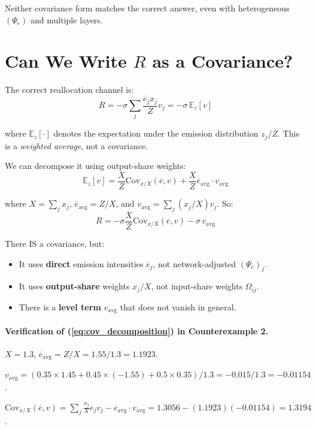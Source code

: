 \documentclass[11pt]{article}
\begin{document}
Neither covariance form matches the correct answer, even with heterogeneous $(\Psi_e)$ and multiple layers.

\section{Can We Write $R$ as a Covariance?}

The correct reallocation channel is:
$$R = -\sigma \sum_j \frac{\overline{e}_j x_j}{Z}v_j = -\sigma\, \mathbb{E}_{z}[v]$$

where $\mathbb{E}_z[\cdot]$ denotes the expectation under the emission distribution $z_j/Z$. This is a \textit{weighted average}, not a covariance.

We can decompose it using output-share weights:
$$\mathbb{E}_z[v] = \frac{X}{Z}\text{Cov}_{x/X}(\overline{e}, v) + \frac{X}{Z}\overline{e}_{\text{avg}} \cdot v_{\text{avg}}$$

where $X = \sum_j x_j$, $\overline{e}_{\text{avg}} = Z/X$, and $v_{\text{avg}} = \sum_j (x_j/X)v_j$. So:
\begin{equation}
    \label{eq:cov_decomposition}
    R = -\sigma\frac{X}{Z}\text{Cov}_{x/X}(\overline{e}, v) - \sigma\, v_{\text{avg}}
\end{equation}

There IS a covariance, but:
\begin{itemize}
    \item It uses \textbf{direct} emission intensities $\overline{e}_j$, not network-adjusted $(\Psi_e)_j$.
    \item It uses \textbf{output-share} weights $x_j/X$, not input-share weights $\Omega_{ij}$.
    \item There is a \textbf{level term} $v_{\text{avg}}$ that does not vanish in general.
\end{itemize}

\paragraph{Verification of (\ref{eq:cov_decomposition}) in Counterexample 2.}

$X = 1.3$, $\overline{e}_{\text{avg}} = Z/X = 1.55/1.3 = 1.1923$.

$v_{\text{avg}} = (0.35 \times 1.45 + 0.45 \times (-1.55) + 0.5 \times 0.35)/1.3 = -0.015/1.3 = -0.01154$.

$\text{Cov}_{x/X}(\overline{e}, v) = \sum_j \frac{x_j}{X}\overline{e}_j v_j - \overline{e}_{\text{avg}} \cdot v_{\text{avg}} = 1.3056 - (1.1923)(-0.01154) = 1.3194$.
\end{document}
